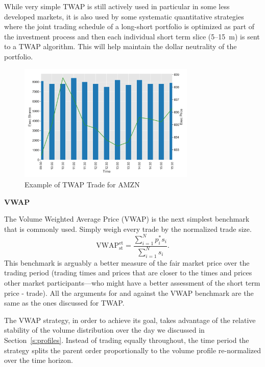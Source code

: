 While very simple TWAP is still actively used in particular in some less developed markets, it is also used by some systematic quantitative strategies where the joint trading schedule of a long-short portfolio is optimized as part of the investment process and then each individual short term slice (5--15~m) is sent to a TWAP algorithm. This will help maintain the dollar neutrality of the portfolio. \twomedskip

        \begin{figure}[!ht]
        \centering
        \includegraphics[width=0.75\textwidth]{chapters/chapter_exec_models/figures/twap.png} 
        \caption{Example of TWAP Trade for AMZN \label{fig:vwap}}
        \end{figure}


\noindent\textbf{VWAP} \twomedskip


The Volume Weighted Average Price (VWAP) is the next simplest benchmark that is commonly used. Simply weigh every trade by the normalized trade size.
        \begin{equation} \label{eq:vwapstet}
        \text{VWAP}_{\text{st}} ^{\text{et}}= \dfrac{ \sum_{i=1}^N p_i^* s_i }{ \sum_{i=1}^N s_i }.
        \end{equation}
This benchmark  is arguably a better measure of the fair market price over the trading period (trading times and prices that are closer to the times and prices other market participants---who might have a better assessment of the short term price - trade). All the arguments for and against the VWAP benchmark are the same as the ones discussed for TWAP. 


The VWAP strategy, in order to achieve its goal, takes advantage of the relative stability of the volume distribution over the day we discussed in Section~\ref{s:profiles}. Instead of trading equally throughout, the time period the strategy splits the parent order proportionally to the volume profile re-normalized over the time horizon.


